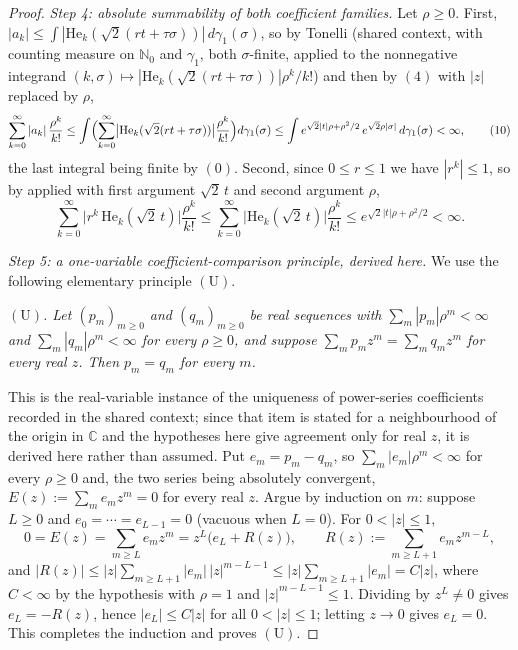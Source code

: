 \begin{proof}
\emph{Step 4: absolute summability of both coefficient families.}
Let $\rho \geq 0$.  First, $|a_k| \leq \int |\mathrm{He}_k(\sqrt2(rt+\tau\sigma))|\,
d\gamma_1(\sigma)$, so by Tonelli (shared context, with counting measure on
$\mathbb{N}_0$ and $\gamma_1$, both $\sigma$-finite, applied to the nonnegative
integrand $(k,\sigma) \mapsto |\mathrm{He}_k(\sqrt2(rt+\tau\sigma))|\rho^k/k!$)
and then by $(4)$ with $|z|$ replaced by $\rho$,
\begin{equation*}
  \sum_{k=0}^\infty |a_k|\,\frac{\rho^k}{k!}
    \leq \int \Bigl(\sum_{k=0}^\infty
        \bigl|\mathrm{He}_k(\sqrt2(rt+\tau\sigma))\bigr|\frac{\rho^k}{k!}\Bigr)
        d\gamma_1(\sigma)
    \leq \int e^{\sqrt2|t|\rho + \rho^2/2}\,e^{\sqrt2\rho|\sigma|}\,d\gamma_1(\sigma)
    < \infty ,
  \tag{10}
\end{equation*}
the last integral being finite by $(0)$.  Second, since $0 \leq r \leq 1$ we have
$|r^k| \leq 1$, so by  applied with first argument
$\sqrt2\,t$ and second argument $\rho$,
\begin{equation*}
  \sum_{k=0}^\infty \bigl|r^k\,\mathrm{He}_k(\sqrt2\,t)\bigr|\frac{\rho^k}{k!}
    \leq \sum_{k=0}^\infty \bigl|\mathrm{He}_k(\sqrt2\,t)\bigr|\frac{\rho^k}{k!}
    \leq e^{\sqrt2|t|\rho + \rho^2/2} < \infty .
  \tag{11}
\end{equation*}

\emph{Step 5: a one-variable coefficient-comparison principle, derived here.}
We use the following elementary principle $(\mathrm{U})$.

\smallskip
\noindent\emph{$(\mathrm{U})$.  Let $(p_m)_{m\geq0}$ and $(q_m)_{m\geq0}$ be real
sequences with $\sum_m |p_m|\rho^m < \infty$ and $\sum_m |q_m|\rho^m < \infty$ for
every $\rho \geq 0$, and suppose $\sum_m p_m z^m = \sum_m q_m z^m$ for every real
$z$.  Then $p_m = q_m$ for every $m$.}

\smallskip
\noindent This is the real-variable instance of the uniqueness of power-series
coefficients recorded in the shared context; since that item is stated for a
neighbourhood of the origin in $\mathbb{C}$ and the hypotheses here give
agreement only for real $z$, it is derived here rather than assumed.  Put
$e_m = p_m - q_m$, so $\sum_m |e_m|\rho^m < \infty$ for every $\rho \geq 0$ and,
the two series being absolutely convergent, $E(z) := \sum_m e_m z^m = 0$ for every
real $z$.  Argue by induction on $m$: suppose $L \geq 0$ and
$e_0 = \cdots = e_{L-1} = 0$ (vacuous when $L = 0$).  For $0 < |z| \leq 1$,
\[
  0 = E(z) = \sum_{m\geq L} e_m z^m = z^L\bigl(e_L + R(z)\bigr),
  \qquad R(z) := \sum_{m \geq L+1} e_m z^{m-L},
\]
and $|R(z)| \leq |z|\sum_{m\geq L+1}|e_m|\,|z|^{m-L-1}
\leq |z|\sum_{m\geq L+1}|e_m| = C|z|$, where $C < \infty$ by the hypothesis with
$\rho = 1$ and $|z|^{m-L-1} \leq 1$.  Dividing by $z^L \neq 0$ gives
$e_L = -R(z)$, hence $|e_L| \leq C|z|$ for all $0 < |z| \leq 1$; letting
$z \to 0$ gives $e_L = 0$.  This completes the induction and proves
$(\mathrm{U})$.


\end{proof}
